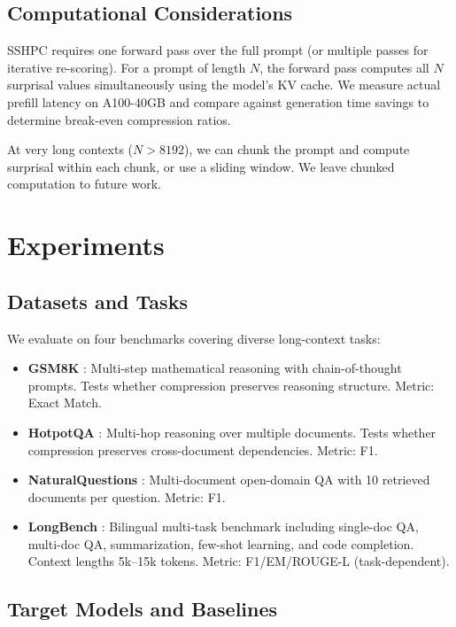 \documentclass[11pt,letterpaper]{article}
\begin{document}
\subsection{Computational Considerations}

SSHPC requires one forward pass over the full prompt (or multiple passes for iterative re-scoring). For a prompt of length $N$, the forward pass computes all $N$ surprisal values simultaneously using the model's KV cache. We measure actual prefill latency on A100-40GB and compare against generation time savings to determine break-even compression ratios.

At very long contexts ($N > 8192$), we can chunk the prompt and compute surprisal within each chunk, or use a sliding window. We leave chunked computation to future work.

\section{Experiments}

\subsection{Datasets and Tasks}

We evaluate on four benchmarks covering diverse long-context tasks:

\begin{itemize}
  \item \textbf{GSM8K} \citep{Cobbe2021}: Multi-step mathematical reasoning with chain-of-thought prompts. Tests whether compression preserves reasoning structure. Metric: Exact Match.
  \item \textbf{HotpotQA} \citep{Yang2018}: Multi-hop reasoning over multiple documents. Tests whether compression preserves cross-document dependencies. Metric: F1.
  \item \textbf{NaturalQuestions} \citep{Kwiatkowski2019}: Multi-document open-domain QA with 10 retrieved documents per question. Metric: F1.
  \item \textbf{LongBench} \citep{Bai2023}: Bilingual multi-task benchmark including single-doc QA, multi-doc QA, summarization, few-shot learning, and code completion. Context lengths 5k--15k tokens. Metric: F1/EM/ROUGE-L (task-dependent).
\end{itemize}

\subsection{Target Models and Baselines}
\end{document}
